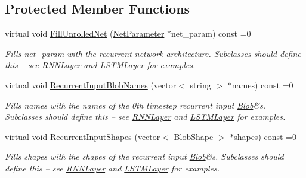 \subsection*{Protected Member Functions}
\begin{DoxyCompactItemize}
\item 
\mbox{\label{classcaffe_1_1_recurrent_layer_a04a3a032c4d0be559d88865a13a2d927}} 
virtual void \mbox{\hyperlink{classcaffe_1_1_recurrent_layer_a04a3a032c4d0be559d88865a13a2d927}{Fill\+Unrolled\+Net}} (\mbox{\hyperlink{classcaffe_1_1_net_parameter}{Net\+Parameter}} $\ast$net\+\_\+param) const =0
\begin{DoxyCompactList}\small\item\em Fills net\+\_\+param with the recurrent network architecture. Subclasses should define this -- see \mbox{\hyperlink{classcaffe_1_1_r_n_n_layer}{R\+N\+N\+Layer}} and \mbox{\hyperlink{classcaffe_1_1_l_s_t_m_layer}{L\+S\+T\+M\+Layer}} for examples. \end{DoxyCompactList}\item 
\mbox{\label{classcaffe_1_1_recurrent_layer_a9d9dab800f838e38651678718adfbbf6}} 
virtual void \mbox{\hyperlink{classcaffe_1_1_recurrent_layer_a9d9dab800f838e38651678718adfbbf6}{Recurrent\+Input\+Blob\+Names}} (vector$<$ string $>$ $\ast$names) const =0
\begin{DoxyCompactList}\small\item\em Fills names with the names of the 0th timestep recurrent input \mbox{\hyperlink{classcaffe_1_1_blob}{Blob}}\&s. Subclasses should define this -- see \mbox{\hyperlink{classcaffe_1_1_r_n_n_layer}{R\+N\+N\+Layer}} and \mbox{\hyperlink{classcaffe_1_1_l_s_t_m_layer}{L\+S\+T\+M\+Layer}} for examples. \end{DoxyCompactList}\item 
\mbox{\label{classcaffe_1_1_recurrent_layer_ad2c2427c11960e0b8961c31ff2f74c03}} 
virtual void \mbox{\hyperlink{classcaffe_1_1_recurrent_layer_ad2c2427c11960e0b8961c31ff2f74c03}{Recurrent\+Input\+Shapes}} (vector$<$ \mbox{\hyperlink{classcaffe_1_1_blob_shape}{Blob\+Shape}} $>$ $\ast$shapes) const =0
\begin{DoxyCompactList}\small\item\em Fills shapes with the shapes of the recurrent input \mbox{\hyperlink{classcaffe_1_1_blob}{Blob}}\&s. Subclasses should define this -- see \mbox{\hyperlink{classcaffe_1_1_r_n_n_layer}{R\+N\+N\+Layer}} and \mbox{\hyperlink{classcaffe_1_1_l_s_t_m_layer}{L\+S\+T\+M\+Layer}} for examples. \end{DoxyCompactList}\item 

\end{DoxyCompactItemize}
